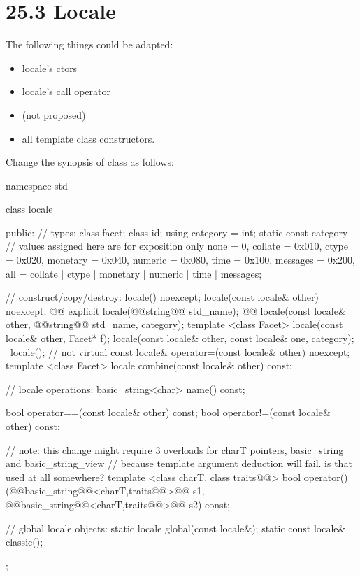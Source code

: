 \documentclass[ebook,11pt,article]{memoir}
\begin{document}
\section{25.3 Locale}
The following things could be adapted:
\begin{itemize}
\item locale's ctors 
\item locale's call operator
\item {} (not proposed)
\item all  template class constructors.
\end{itemize}


Change the synopsis of class  as follows:
\begin{codeblock}
namespace std {
  class locale {
  public:
    // types:
    class facet;
    class id;
    using category = int;
    static const category   // values assigned here are for exposition only
      none     = 0,
      collate  = 0x010, ctype    = 0x020,
      monetary = 0x040, numeric  = 0x080,
      time     = 0x100, messages = 0x200,
      all = collate | ctype | monetary | numeric | time  | messages;

    // construct/copy/destroy:
    locale() noexcept;
    locale(const locale& other) noexcept;
    @@
    explicit locale(@@string@\removed{\&}@ std_name);
    @@
    locale(const locale& other, @@string@\removed{\&}@ std_name, category);
    template <class Facet> locale(const locale& other, Facet* f);
    locale(const locale& other, const locale& one, category);
    ~locale();                  // not virtual
    const locale& operator=(const locale& other) noexcept;
    template <class Facet> locale combine(const locale& other) const;

    // locale operations:
    basic_string<char>                  name() const;

    bool operator==(const locale& other) const;
    bool operator!=(const locale& other) const;

// note: this change might require 3 overloads for charT pointers, basic_string and basic_string_view
// because template argument deduction will fail. is that used at all somewhere?
    template <class charT, class traits@@>
      bool operator()(@@basic_string@@<charT,traits@@>@\removed{\&}@ s1,
                      @@basic_string@@<charT,traits@@>@\removed{\&}@ s2) const;

    // global locale objects:
    static       locale  global(const locale&);
    static const locale& classic();
  };
}
\end{codeblock}
\end{document}
